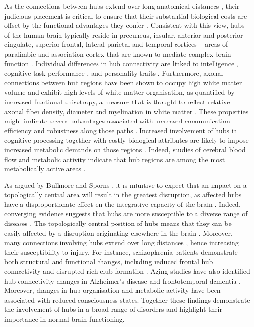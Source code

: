 As the connections between hubs extend over long anatomical distances \citep{Fulcher2016,Towlson2013,VandenHeuvel2011}, their judicious placement is critical to ensure that their substantial biological costs are offset by the functional advantages they confer \citep{DeReus2014,Towlson2013}. Consistent with this view, hubs of the human brain typically reside in precuneus, insular, anterior and posterior cingulate, superior frontal, lateral parietal and temporal cortices \citep{Gong2009,VandenHeuvel2012,VandenHeuvel2013a} -- areas of paralimbic and association cortex that are known to mediate complex brain function \citep{Buckner2009,Mesulam1998}. Individual differences in hub connectivity are linked to intelligence \citep{Li2009,VandenHeuvel2009}, cognitive task performance \mbox{\citep{Cole2012}}, and personality traits \citep{Adelstein2011}. Furthermore, axonal connections between hub regions have been shown to occupy high white matter volume and exhibit high levels of white matter organisation, as quantified by increased fractional anisotropy, a measure that is thought to reflect relative axonal fiber density, diameter and myelination in white matter \mbox{\citep{Collin2014}}. These properties might indicate several advantages associated with increased communication efficiency and robustness along those paths \mbox{\citep{Collin2014}}. Increased involvement of hubs in cognitive processing \citep{Buckner2009,Cole2012,Mesulam1998} together with costly biological attributes are likely to impose increased metabolic demands on those regions \mbox{\citep{Collin2014}}. Indeed, studies of cerebral blood flow and metabolic activity indicate that hub regions are among the most metabolically active areas \mbox{\citep{Vaishnavi2010,Varkuti2011}}.

As argued by Bullmore and Sporns \citep{Bullmore2012}, it is intuitive to expect that an impact on a topologically central area will result in the greatest disruption, as affected hubs have a disproportionate effect on the integrative capacity of the brain \mbox{\citep{DeReus2014}}. Indeed, converging evidence suggests that hubs are more susceptible to a diverse range of diseases \citep{Bassett2009a,Crossley2014,Fornito2015}. The topologically central position of hubs means that they can be easily affected by a disruption originating elsewhere in the brain \citep{Zhou2012}. Moreover, many connections involving hubs extend over long distances \citep{VandenHeuvel2012}, hence increasing their susceptibility to injury. For instance, schizophrenia patients demonstrate both structural and functional changes, including reduced frontal hub connectivity \citep{Fornito2012a,VandenHeuvel2010,Zalesky2011} and disrupted rich-club formation \citep{VandenHeuvel2013c}. Aging studies have also identified hub connectivity changes in Alzheimer’s disease \citep{DeHaan2012,Stam2009} and frontotemporal dementia \citep{Agosta2013}. Moreover, changes in hub organisation \citep{Achard2012} and metabolic activity \citep{Laureys2004} have been associated with reduced consciousness states. Together these findings demonstrate the involvement of hubs in a broad range of disorders and highlight their importance in normal brain functioning.


